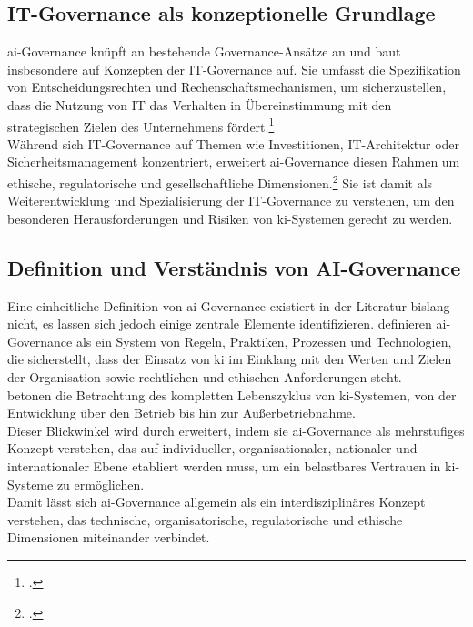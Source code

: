 \subsection{IT-Governance als konzeptionelle Grundlage}
\label{subsec:aigovernance}
\ac{ai}-Governance knüpft an bestehende Governance-Ansätze an und baut insbesondere auf Konzepten der IT-Governance auf.
Sie umfasst \glqq{}die Spezifikation von Entscheidungsrechten und Rechenschaftsmechanismen, um sicherzustellen, dass die Nutzung von IT das Verhalten in Übereinstimmung mit den strategischen Zielen des Unternehmens fördert\grqq{}.\footcite[64]{weillITGovernanceHow2004}
\\
Während sich IT-Governance auf Themen wie Investitionen, IT-Architektur oder Sicherheitsmanagement konzentriert, erweitert \ac{ai}-Governance diesen Rahmen um ethische, regulatorische und gesellschaftliche Dimensionen.\footcite[2-4]{choungMultilevelFrameworkAI2023}
Sie ist damit als Weiterentwicklung und Spezialisierung der IT-Governance zu verstehen, um den besonderen Herausforderungen und Risiken von \ac{ki}-Systemen gerecht zu werden.

\subsection{Definition und Verständnis von AI-Governance}
\label{subsec:definition}
Eine einheitliche Definition von \ac{ai}-Governance existiert in der Literatur bislang nicht, es lassen sich jedoch einige zentrale Elemente identifizieren.
\cite[2-3]{mantymakiPDFPuttingAI2025} definieren \ac{ai}-Governance als ein System von Regeln, Praktiken, Prozessen und Technologien, die sicherstellt, dass der Einsatz von \ac{ki} im Einklang mit den Werten und Zielen der Organisation sowie rechtlichen und ethischen Anforderungen steht.
\\
\cite[2-3]{batoolResponsibleAIGovernance2023} betonen die Betrachtung des kompletten Lebenszyklus von \ac{ki}-Systemen, von der Entwicklung über den Betrieb bis hin zur Außerbetriebnahme.
\\
Dieser Blickwinkel wird durch \cite[2-4]{choungMultilevelFrameworkAI2023} erweitert, indem sie \ac{ai}-Governance als mehrstufiges Konzept verstehen, das auf individueller, organisationaler, nationaler und internationaler Ebene etabliert werden muss, um ein belastbares Vertrauen in \ac{ki}-Systeme zu ermöglichen.
\\
Damit lässt sich \ac{ai}-Governance allgemein als ein interdisziplinäres Konzept verstehen, das technische, organisatorische, regulatorische und ethische Dimensionen miteinander verbindet.

